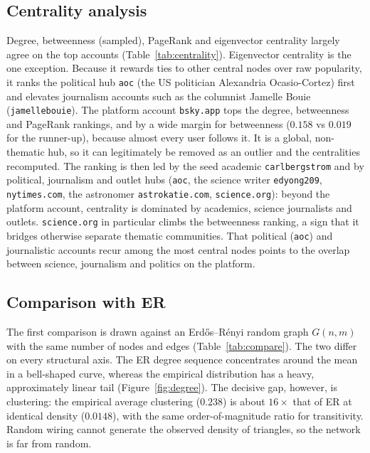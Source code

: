 \subsection{Centrality analysis}
Degree, betweenness (sampled), PageRank and eigenvector centrality largely agree on the top accounts (Table~\ref{tab:centrality}). Eigenvector centrality is the one exception. Because it rewards ties to other central nodes over raw popularity, it ranks the political hub \texttt{aoc} (the US politician Alexandria Ocasio-Cortez) first and elevates journalism accounts such as the columnist Jamelle Bouie (\texttt{jamellebouie}). The platform account \texttt{bsky.app} tops the degree, betweenness and PageRank rankings, and by a wide margin for betweenness ($0.158$ vs $0.019$ for the runner-up), because almost every user follows it. It is a global, non-thematic hub, so it can legitimately be removed as an outlier and the centralities recomputed. The ranking is then led by the seed academic \texttt{carlbergstrom} and by political, journalism and outlet hubs (\texttt{aoc}, the science writer \texttt{edyong209}, \texttt{nytimes.com}, the astronomer \texttt{astrokatie.com}, \texttt{science.org}): beyond the platform account, centrality is dominated by academics, science journalists and outlets. \texttt{science.org} in particular climbs the betweenness ranking, a sign that it bridges otherwise separate thematic communities. That political (\texttt{aoc}) and journalistic accounts recur among the most central nodes points to the overlap between science, journalism and politics on the platform.


\subsection{Comparison with ER}
The first comparison is drawn against an Erd\H{o}s--R\'enyi random graph $G(n,m)$ with the same number of nodes and edges (Table~\ref{tab:compare}). The two differ on every structural axis. The ER degree sequence concentrates around the mean in a bell-shaped curve, whereas the empirical distribution has a heavy, approximately linear tail (Figure~\ref{fig:degree}). The decisive gap, however, is clustering: the empirical average clustering ($0.238$) is about $16\times$ that of ER at identical density ($0.0148$), with the same order-of-magnitude ratio for transitivity. Random wiring cannot generate the observed density of triangles, so the network is far from random.

